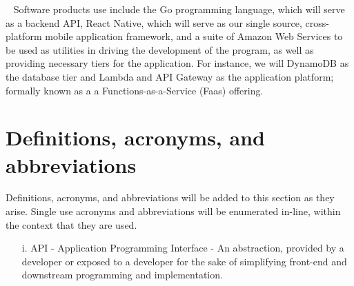 \documentclass{scrreprt}
\begin{document}
\par ~ Software products use include the Go programming language, which will serve as a backend API, React Native, which will serve as our single source, cross-platform mobile application framework, and a suite of Amazon Web Services to be used as utilities in driving the development of the program, as well as providing necessary tiers for the application. For instance, we will DynamoDB as the database tier and Lambda and API Gateway as the application platform; formally known as a a Functions-as-a-Service (Faas) offering.


\section{Definitions, acronyms, and abbreviations}
Definitions, acronyms, and abbreviations will be added to this section as they arise. Single use acronyms and abbreviations will be enumerated in-line, within the context that they are used.
\begin{enumerate}
	\item[i.] API - Application Programming Interface - An abstraction, provided by a developer or exposed to a developer for the sake of simplifying front-end and downstream programming and implementation.
\end{enumerate}
 
\end{document}

